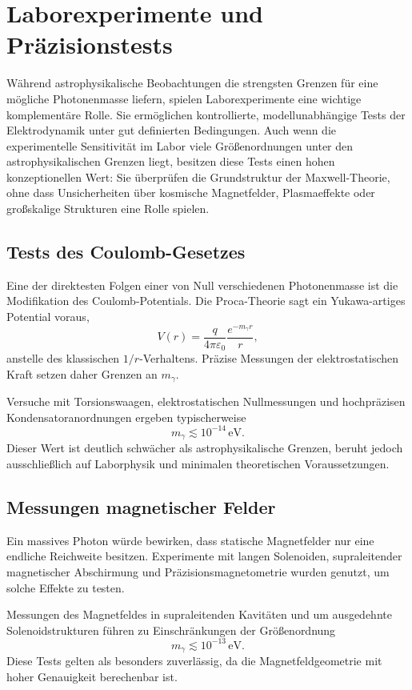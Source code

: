 \section{Laborexperimente und Präzisionstests}

Während astrophysikalische Beobachtungen die strengsten Grenzen für eine 
mögliche Photonenmasse liefern, spielen Laborexperimente eine wichtige 
komplementäre Rolle. Sie ermöglichen kontrollierte, modellunabhängige Tests 
der Elektrodynamik unter gut definierten Bedingungen. Auch wenn die 
experimentelle Sensitivität im Labor viele Größenordnungen unter den 
astrophysikalischen Grenzen liegt, besitzen diese Tests einen hohen 
konzeptionellen Wert: Sie überprüfen die Grundstruktur der 
Maxwell-Theorie, ohne dass Unsicherheiten über kosmische Magnetfelder, 
Plasmaeffekte oder großskalige Strukturen eine Rolle spielen.

\subsection*{Tests des Coulomb-Gesetzes}

Eine der direktesten Folgen einer von Null verschiedenen Photonenmasse ist 
die Modifikation des Coulomb-Potentials. Die Proca-Theorie sagt ein 
Yukawa-artiges Potential voraus,
\[
V(r) = \frac{q}{4\pi\varepsilon_0} \frac{e^{-m_\gamma r}}{r},
\]
anstelle des klassischen $1/r$-Verhaltens. Präzise Messungen der 
elektrostatischen Kraft setzen daher Grenzen an $m_\gamma$.

Versuche mit Torsionswaagen, elektrostatischen Nullmessungen und 
hochpräzisen Kondensatoranordnungen ergeben typischerweise
\[
m_\gamma \lesssim 10^{-14}\,\text{eV}.
\]
Dieser Wert ist deutlich schwächer als astrophysikalische Grenzen, beruht 
jedoch ausschließlich auf Laborphysik und minimalen theoretischen 
Voraussetzungen.

\subsection*{Messungen magnetischer Felder}

Ein massives Photon würde bewirken, dass statische Magnetfelder nur eine 
endliche Reichweite besitzen. Experimente mit langen Solenoiden, 
supraleitender magnetischer Abschirmung und Präzisionsmagnetometrie wurden 
genutzt, um solche Effekte zu testen.

Messungen des Magnetfeldes in supraleitenden Kavitäten und um ausgedehnte 
Solenoidstrukturen führen zu Einschränkungen der Größenordnung
\[
m_\gamma \lesssim 10^{-13}\,\text{eV}.
\]
Diese Tests gelten als besonders zuverlässig, da die Magnetfeldgeometrie 
mit hoher Genauigkeit berechenbar ist.

